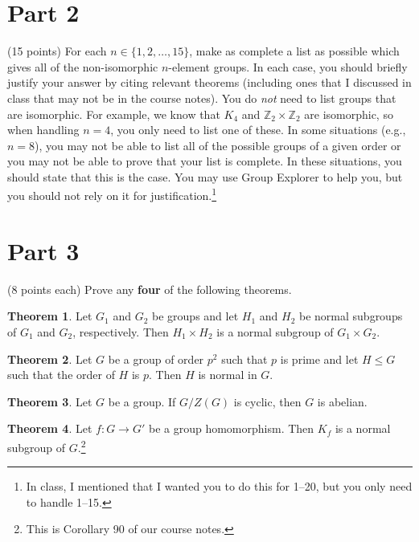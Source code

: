 \documentclass[11pt]{article}
\theoremstyle{definition}
\newtheorem{theorem}{Theorem}
\begin{document}
\section*{Part 2}

(15 points) For each $n\in \{1,2,\ldots, 15\}$, make as complete a list as possible which gives all of the non-isomorphic $n$-element groups.  In each case, you should briefly justify your answer by citing relevant theorems (including ones that I discussed in class that may not be in the course notes).  You do \emph{not} need to list groups that are isomorphic.  For example, we know that $K_4$ and $\mathbb{Z}_2\times \mathbb{Z}_2$ are isomorphic, so when handling $n=4$, you only need to list one of these.  In some situations (e.g., $n=8$), you may not be able to list all of the possible groups of a given order or you may not be able to prove that your list is complete.  In these situations, you should state that this is the case.  You may use Group Explorer to help you, but you should not rely on it for justification.\footnote{In class, I mentioned that I wanted you to do this for 1--20, but you only need to handle 1--15.}

\section*{Part 3}

(8 points each) Prove any \textbf{four} of the following theorems.

\begin{theorem}
Let $G_1$ and $G_2$ be groups and let $H_1$ and $H_2$ be normal subgroups of $G_1$ and $G_2$, respectively.  Then $H_1\times H_2$ is a normal subgroup of $G_1\times G_2$.
\end{theorem}

\begin{theorem}
Let $G$ be a group of order $p^2$ such that $p$ is prime and let $H\leq G$ such that the order of $H$ is $p$.  Then $H$ is normal in $G$.
\end{theorem}

\begin{theorem}
Let $G$ be a group.  If $G/Z(G)$ is cyclic, then $G$ is abelian.
\end{theorem}

\begin{theorem}
Let $f:G\to G'$ be a group homomorphism.  Then $K_f$ is a normal subgroup of $G$.\footnote{This is Corollary 90 of our course notes.}
\end{theorem}
\end{document}
